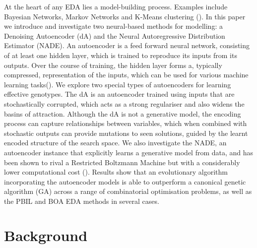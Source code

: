 \documentclass[twoside]{article}
\begin{document}
At the heart of any EDA lies a model-building process. Examples include Bayesian Networks, Markov Networks and K-Means clustering (\cite{pelikan2002survey}). In this paper we introduce and investigate two neural-based methods for modelling: a Denoising Autoencoder (dA) and the Neural Autoregressive Distribution Estimator (NADE). An autoencoder is a feed forward neural network, consisting of at least one hidden layer, which is trained to reproduce its inputs from its outputs. Over the course of training, the hidden layer forms a, typically compressed, representation of the inputs, which can be used for various machine learning tasks(\cite{hinton2006reducing}). We explore two special types of autoencoders for learning effective genotypes. The dA is an autoencoder trained using inputs that are stochastically corrupted, which acts as a strong regulariser and also widens the basins of attraction. Although the dA is not a generative model, the encoding process can capture relationships between variables, which when combined with stochastic outputs can provide mutations to seen solutions, guided by the learnt encoded structure of the search space. %
We also investigate the NADE, an autoencoder instance that explicitly learns a generative model from data, and has been shown to rival a Restricted Boltzmann Machine but with a considerably lower computational cost (\cite{larochelle2011neural}). Results show that an evolutionary algorithm incorporating the autoencoder models is able to outperform a canonical genetic algorithm (GA) across a range of combinatorial optimisation problems, as well as the PBIL and BOA EDA methods in several cases.

\section{Background}
\end{document}
